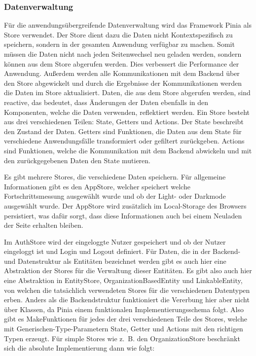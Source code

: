 \subsubsection{Datenverwaltung}
Für die anwendungsübergreifende Datenverwaltung wird das Framework Pinia als Store verwendet. Der Store dient dazu die Daten nicht Kontextspezifisch zu speichern, sondern in der gesamten Anwendung verfügbar zu machen. Somit müssen die Daten nicht nach jeden Seitenwechsel neu geladen werden, sondern können aus dem Store abgerufen werden. Dies verbessert die Performance der Anwendung. Außerdem werden alle Kommunikationen mit dem Backend über den Store abgewickelt und durch die Ergebnisse der Kommunikationen werden die Daten im Store aktualisiert. Daten, die aus dem Store abgerufen werden, sind reactive, das bedeutet, dass Änderungen der Daten ebenfalls in den Komponenten, welche die Daten verwenden, reflektiert werden. Ein Store besteht aus drei verschiedenen Teilen: State, Getters und Actions. Der State beschreibt den Zustand der Daten. Getters sind Funktionen, die Daten aus dem State für verschiedene Anwendungsfälle transformiert oder gefiltert zurückgeben. Actions sind Funktionen, welche die Kommunikation mit dem Backend abwickeln und mit den zurückgegebenen Daten den State mutieren.

Es gibt mehrere Stores, die verschiedene Daten speichern. Für allgemeine Informationen gibt es den AppStore, welcher speichert welche Fortschrittsmessung ausgewählt wurde und ob der Light- oder Darkmode ausgewählt wurde. Der AppStore wird zusätzlich im Local-Storage des Browsers persistiert, was dafür sorgt, dass diese Informationen auch bei einem Neuladen der Seite erhalten bleiben.

Im AuthStore wird der eingeloggte Nutzer gespeichert und ob der Nutzer eingeloggt ist und Login und Logout definiert.
Für Daten, die in der Backend- und Datenstruktur als Entitäten bezeichnet werden gibt es auch hier eine Abstraktion der Stores für die Verwaltung dieser Entitäten. Es gibt also auch hier eine Abstraktion in EntityStore, OrganizationBasedEntity und LinkableEntity, von welchen die tatsächlich verwendeten Stores für die verschiedenen Datentypen erben. Anders als die Backendstruktur funktioniert die Vererbung hier aber nicht über Klassen, da Pinia einem funktionalen Implementierungsschema folgt. Also gibt es MakeFunktionen für jedes der drei verschiedenen Teile des Stores, welche mit Generischen-Type-Parametern State, Getter und Actions mit den richtigen Typen erzeugt. Für simple Stores wie z. B. den OrganizationStore beschränkt sich die absolute Implementierung dann wie folgt:

